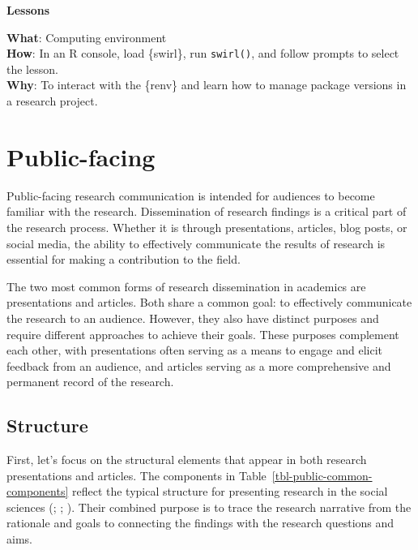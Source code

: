 \documentclass[
  letterpaper,
  krantz1]{latex/krantz-mod}
\theoremstyle{definition}
\theoremstyle{definition}
\theoremstyle{remark}
\begin{document}
\begin{tcolorbox}[enhanced jigsaw, toprule=.15mm, breakable, colback=white, arc=.35mm, left=2mm, colframe=quarto-callout-color-frame, opacityback=0, bottomrule=.15mm, rightrule=.15mm, leftrule=.75mm]

\textbf{ Lessons}

\textbf{What}: Computing environment\\
\textbf{How}: In an R console, load \{swirl\}, run \texttt{swirl()}, and
follow prompts to select the lesson.\\
\textbf{Why}: To interact with the \{renv\} and learn how to manage
package versions in a research project.

\end{tcolorbox}

\section{Public-facing}\label{sec-contribute-public-facing}

Public-facing research communication is intended for audiences to become
familiar with the research. Dissemination of research findings is a
critical part of the research process. Whether it is through
presentations, articles, blog posts, or social media, the ability to
effectively communicate the results of research is essential for making
a contribution to the field.

The two most common forms of research dissemination in academics are
presentations and articles. Both share a common goal: to effectively
communicate the research to an audience. However, they also have
distinct purposes and require different approaches to achieve their
goals. These purposes complement each other, with presentations often
serving as a means to engage and elicit feedback from an audience, and
articles serving as a more comprehensive and permanent record of the
research.

\subsection{Structure}\label{sec-contribute-public-structure}

First, let's focus on the structural elements that appear in both
research presentations and articles. The components in
Table~\ref{tbl-public-common-components} reflect the typical structure
for presenting research in the social sciences
(; ; ). Their combined purpose is to trace the research narrative from
the rationale and goals to connecting the findings with the research
questions and aims.
\end{document}
